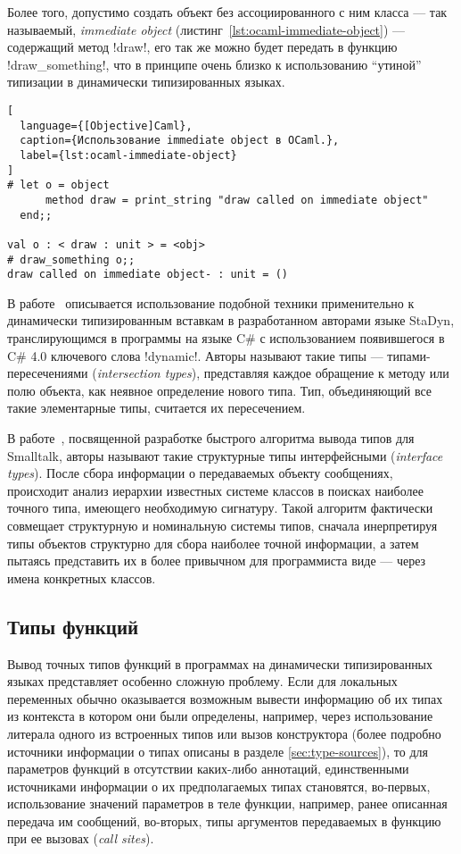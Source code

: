 Более того, допустимо создать объект без ассоциированного с ним класса --- так
называемый, \emph{immediate object} (листинг~\ref{lst:ocaml-immediate-object})
--- содержащий метод !draw!, его так же можно будет передать в функцию
!draw_something!, что в принципе очень близко к использованию ``утиной'' типизации в
динамически типизированных языках.

\begin{lstlisting}[
  language={[Objective]Caml},
  caption={Использование immediate object в OCaml.},
  label={lst:ocaml-immediate-object}
]
# let o = object
      method draw = print_string "draw called on immediate object"
  end;;

val o : < draw : unit > = <obj>
# draw_something o;;
draw called on immediate object- : unit = ()
\end{lstlisting}
\lstset{language=Python}

В работе~\cite{Ortin2011:union} описывается использование подобной техники
применительно к динамически типизированным вставкам в разработанном авторами
языке StaDyn, транслирующимся в программы на языке C\# с использованием
появившегося в C\# 4.0 ключевого слова !dynamic!.  Авторы называют такие
типы --- типами-пересечениями (\emph{intersection types}), представляя каждое
обращение к методу или полю объекта, как неявное определение нового типа. Тип,
объединяющий все такие элементарные типы, считается их пересечением.

В работе~\cite{Pluquet2009}, посвященной разработке быстрого алгоритма вывода
типов для Smalltalk, авторы называют такие структурные типы интерфейсными 
(\emph{interface types}). После сбора информации о передаваемых объекту сообщениях,
происходит анализ иерархии известных системе классов в поисках наиболее
точного типа, имеющего необходимую сигнатуру. Такой алгоритм фактически
совмещает структурную и номинальную системы типов, сначала инерпретируя типы
объектов структурно для сбора наиболее точной информации, а затем пытаясь
представить их в более привычном для программиста виде --- через имена
конкретных классов.

\subsection{Типы функций}

Вывод точных типов функций в программах на динамически типизированных языках
представляет особенно сложную проблему. Если для локальных переменных обычно
оказывается возможным вывести информацию об их типах из контекста в котором они
были определены, например, через использование литерала одного из встроенных
типов или вызов конструктора (более подробно источники информации о типах
описаны в разделе \ref{sec:type-sources}), то для параметров функций в
отсутствии каких-либо аннотаций, единственными источниками информации о их
предполагаемых типах становятся, во-первых, использование значений параметров в
теле функции, например, ранее описанная передача им сообщений, во-вторых, типы
аргументов передаваемых в функцию при ее вызовах (\emph{call sites}).

